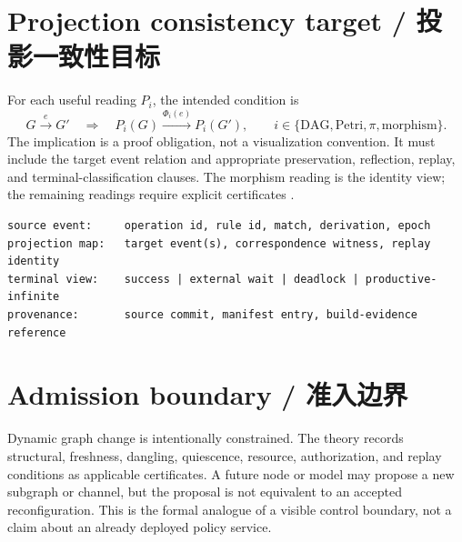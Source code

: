 \section{Projection consistency target / 投影一致性目标}

For each useful reading \(P_i\), the intended condition is
\begin{equation}
  G\xrightarrow{e}G'\quad\Longrightarrow\quad
  P_i(G)\xrightarrow{\Phi_i(e)}P_i(G'),
  \qquad i\in\{\mathrm{DAG},\mathrm{Petri},\pi,\mathrm{morphism}\}.
  \label{eq:projection-consistency}
\end{equation}
The implication is a proof obligation, not a visualization convention. It must include the target
event relation and appropriate preservation, reflection, replay, and terminal-classification
clauses. The morphism reading is the identity view; the remaining readings require explicit
certificates \citep{cantiluneRFCOne,cantiluneRFCTwo}.

\begin{MWCodeBox}
\begin{lstlisting}[style=moonweave]
source event:     operation id, rule id, match, derivation, epoch
projection map:   target event(s), correspondence witness, replay identity
terminal view:    success | external wait | deadlock | productive-infinite
provenance:       source commit, manifest entry, build-evidence reference
\end{lstlisting}
\end{MWCodeBox}

\section{Admission boundary / 准入边界}

Dynamic graph change is intentionally constrained. The theory records structural, freshness,
dangling, quiescence, resource, authorization, and replay conditions as applicable certificates.
A future node or model may propose a new subgraph or channel, but the proposal is not equivalent
to an accepted reconfiguration. This is the formal analogue of a visible control boundary, not a
claim about an already deployed policy service.
